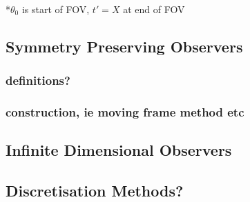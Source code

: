 		*$\theta_0$ is start of FOV, $t'=X$ at end of FOV

\subsection{Symmetry Preserving Observers}
	\subsubsection{definitions?}
	\subsubsection{construction, ie moving frame method etc}
\subsection{Infinite Dimensional Observers}
\subsection{Discretisation Methods?}